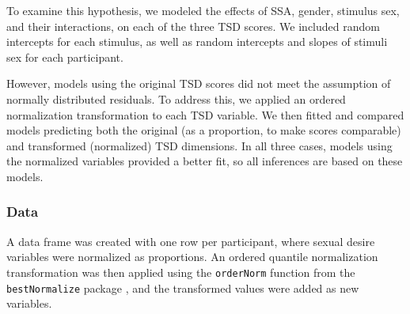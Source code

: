 \documentclass[
  bookmarksnumbered]{article}
\begin{document}
To examine this hypothesis, we modeled the effects of SSA, gender, stimulus sex, and their interactions, on each of the three TSD scores. We included random intercepts for each stimulus, as well as random intercepts and slopes of stimuli sex for each participant.

However, models using the original TSD scores did not meet the assumption of normally distributed residuals. To address this, we applied an ordered normalization transformation to each TSD variable. We then fitted and compared models predicting both the original (as a proportion, to make scores comparable) and transformed (normalized) TSD dimensions. In all three cases, models using the normalized variables provided a better fit, so all inferences are based on these models.

\subsubsection{Data}\label{data-1}

A data frame was created with one row per participant, where sexual desire variables were normalized as proportions. An ordered quantile normalization transformation \autocite{petersonOrderedQuantileNormalization2020a} was then applied using the \texttt{orderNorm} function from the \texttt{bestNormalize} package \autocite{bestNormalizecit}, and the transformed values were added as new variables.
\end{document}
